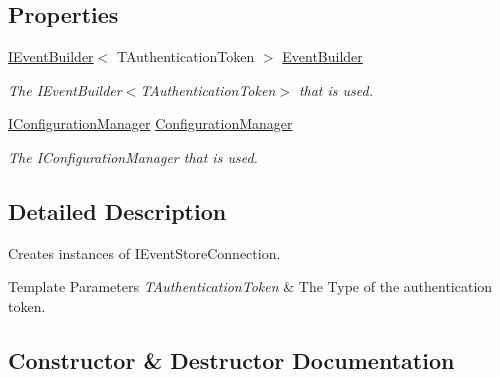 \subsection*{Properties}
\begin{DoxyCompactItemize}
\item 
\hyperlink{interfaceCqrs_1_1EventStore_1_1IEventBuilder}{I\+Event\+Builder}$<$ T\+Authentication\+Token $>$ \hyperlink{classCqrs_1_1EventStore_1_1EventStoreConnectionHelper_a0658657c13dd7edfaca4837e39fd86dd_a0658657c13dd7edfaca4837e39fd86dd}{Event\+Builder}
\begin{DoxyCompactList}\small\item\em The I\+Event\+Builder$<$\+T\+Authentication\+Token$>$ that is used. \end{DoxyCompactList}\item 
\hyperlink{interfaceCqrs_1_1Configuration_1_1IConfigurationManager}{I\+Configuration\+Manager} \hyperlink{classCqrs_1_1EventStore_1_1EventStoreConnectionHelper_aa518bbaa1cd7d75a57429c3cf4dd4f96_aa518bbaa1cd7d75a57429c3cf4dd4f96}{Configuration\+Manager}
\begin{DoxyCompactList}\small\item\em The I\+Configuration\+Manager that is used. \end{DoxyCompactList}\end{DoxyCompactItemize}


\subsection{Detailed Description}
Creates instances of I\+Event\+Store\+Connection. 


\begin{DoxyTemplParams}{Template Parameters}
{\em T\+Authentication\+Token} & The Type of the authentication token.\\
\hline
\end{DoxyTemplParams}


\subsection{Constructor \& Destructor Documentation}
\mbox{\label{classCqrs_1_1EventStore_1_1EventStoreConnectionHelper_ac9d232e255275c70aee4465b08e7fd79_ac9d232e255275c70aee4465b08e7fd79}} 

